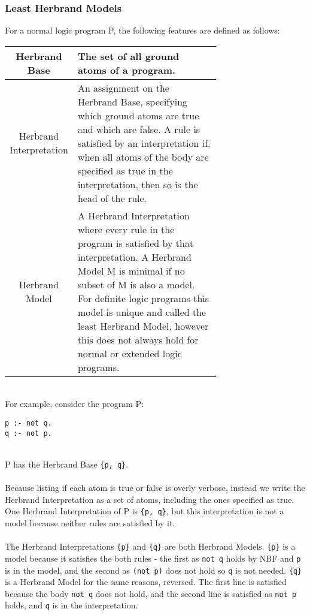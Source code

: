 \subsubsection{Least Herbrand Models}
For a normal logic program P, the following features are defined as follows:

\begin{center}
\begin{tabular}{| c | m{0.7\linewidth} |}
\hline
Herbrand Base & 
\mbox{}\newline
The set of all ground atoms of a program.\newline
\\
\hline
Herbrand Interpretation & 
\mbox{}\newline
An assignment on the Herbrand Base, specifying which ground atoms are true and which are false.\newline \newline
A rule is satisfied by an interpretation if, when all atoms of the body are specified as true in the interpretation, then so is the head of the rule.\newline
\\
\hline
Herbrand Model & 
\mbox{}\newline
A Herbrand Interpretation where every rule in the program is satisfied by that interpretation.\newline \newline
A Herbrand Model M is minimal if no subset of M is also a model. For definite logic programs this model is unique and called the least Herbrand Model, however this does not always hold for normal or extended logic programs.\newline
\\
\hline
\end{tabular}
\end{center}
\mbox{}\\
For example, consider the program P:\\

\begin{lstlisting}
p :- not q.
q :- not p.
\end{lstlisting}
\mbox{}\\
P has the Herbrand Base \lstinline!{p, q}!. \\ \\ 
Because listing if each atom is true or false is overly verbose, instead we write the Herbrand Interpretation as a set of atoms, including the ones specified as true. One Herbrand Interpretation of P is \lstinline!{p, q}!, but this interpretation is not a model because neither rules are satisfied by it. \\ \\
The Herbrand Interpretations \lstinline!{p}! and \lstinline!{q}! are both Herbrand Models. \lstinline!{p}! is a model because it satisfies the both rules - the first as \lstinline!not q! holds by NBF and \lstinline!p! is in the model, and the second as \lstinline!(not p)! does not hold so \lstinline!q! is not needed. \lstinline!{q}! is a Herbrand Model for the same reasons, reversed. The first line is satisfied because the body \lstinline!not q! does not hold, and the second line is satisfied as \lstinline!not p! holds, and \lstinline!q! is in the interpretation.

